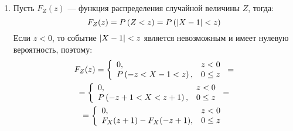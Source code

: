 \begin{enumerate}
    \item Пусть $F_Z(z)$ --- функция распределения случайной величины $Z$, тогда:
    \begin{equation}
        F_Z(z) = P \left ( Z < z \right ) = P \left ( \left | X - 1 \right | < z \right )
    \end{equation}
    Если $z < 0$, то событие $\left | X - 1 \right | < z$ является невозможным и имеет нулевую вероятность, поэтому:
    \begin{multline}
        F_Z(z)
        = \left \{
        \begin{array}{ll}
            0,                            & z < 0    \\
            P \left ( -z < X - 1 < z \right ), & 0 \leq z
        \end{array}
        \right . = \\
        = \left \{
        \begin{array}{ll}
            0,                                & z < 0    \\
            P \left ( -z + 1 < X < z + 1 \right ), & 0 \leq z
        \end{array}
        \right . = \\
        = \left \{
        \begin{array}{ll}
            0,                        & z < 0    \\
            F_X(z + 1) - F_X(-z + 1), & 0 \leq z
        \end{array}
        \right .
    \end{multline}


\end{enumerate}
